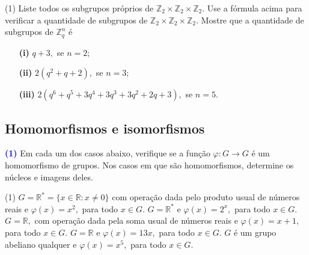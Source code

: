 \documentclass[12pt, a4paper]{article}
\newcommand{\negrito}[1]{\mbox{\boldmath{$#1$}}}
\begin{document}
\begin{tasks}[counter-format={(tsk[a])},label-width=3.6ex, label-format = {\bfseries}, column-sep = {0pt}](1)
\task[\textcolor{Floresta}{$\negrito{(a)} $}] Liste todos os subgrupos próprios de $\mathbb{Z}_2 \times \mathbb{Z}_2 \times \mathbb{Z}_2.$
\task[\textcolor{Floresta}{$\negrito{(b)} $}] Use a fórmula acima para verificar a quantidade de subgrupos de $\mathbb{Z}_2 \times \mathbb{Z}_2 \times \mathbb{Z}_2.$
\task[\textcolor{Floresta}{$\negrito{(c)} $}] Mostre que a quantidade de subgrupos de $\mathbb{Z}_q^n$ é
\begin{itemize}
    \item[\textbf{(i)}] $q+3,$ se $n =2;$%
    \item[\textbf{(ii)}] $2(q^2+q+2),$ se $n =3;$%
    \item[\textbf{(iii)}] $2(q^6+q^5+3q^4+3q^3+3q^2 +2q+3),$ se $n =5.$%
\end{itemize}
\end{tasks}
\newpage
\subsection{\textcolor{Floresta}{Homomorfismos e isomorfismos}}
\textcolor{blue}{\bf(1)}\label{57} Em cada um dos casos abaixo, verifique se a função $\varphi \colon G \to G$ é um homomorfismo de grupos. Nos casos em que são homomorfismos, determine os núcleos e imagens deles.
\begin{tasks}[counter-format={(tsk[a])},label-width=3.6ex, label-format = {\bfseries}, column-sep = {0pt}](1)
\task[\textcolor{Floresta}{$\negrito{(a)} $}] $G = \mathbb{R}^{*} = \{ x \in \mathbb{R} : x \neq 0 \}$ com operação dada pelo produto usual de números reais e $\varphi(x) = x^2,$ para todo $x \in G.$
\task[\textcolor{Floresta}{$\negrito{(b)} $}] $G = \mathbb{R}^{*}$ e $\varphi(x) = 2^x,$ para todo $x \in G.$
\task[\textcolor{Floresta}{$\negrito{(c)} $}] $G = \mathbb{R},$ com operação dada pela soma usual de números reais e $\varphi(x) = x + 1,$ para todo $x \in G.$
\task[\textcolor{Floresta}{$\negrito{(d)} $}] $G = \mathbb{R}$ e $\varphi(x) = 13x,$ para todo $x \in G.$
\task[\textcolor{Floresta}{$\negrito{(e)} $}] $G$ é um grupo abeliano qualquer e $\varphi(x) = x^5,$ para todo $x \in G.$
\end{tasks}
\end{document}
